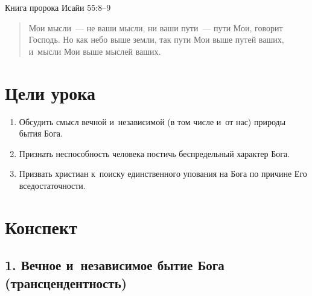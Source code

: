 \documentclass[a4paper,12pt]{article}
\begin{document}
\noindent Книга пророка Исайи 55:8--9

\begin{quote}
Мои мысли~--- не ваши мысли, ни ваши пути~--- пути Мои, говорит Господь.
Но как небо выше земли, так пути Мои выше путей ваших, и~мысли Мои выше мыслей ваших.
\end{quote}

\section*{Цели урока}
\begin{enumerate}
    \item Обсудить смысл вечной и~независимой (в том числе и~от нас) природы бытия Бога.
    \item Признать неспособность человека постичь беспредельный характер Бога.
    \item Призвать христиан к~поиску единственного упования на Бога по причине Его вседостаточности.
\end{enumerate}

\section*{Конспект}

\subsection{1. Вечное и~независимое бытие Бога (трансцендентность)}
\end{document}
